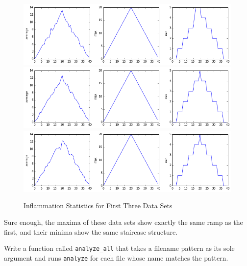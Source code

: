 \begin{figure}
\begin{center}
\includegraphics[scale=0.5]{novice/python/img/inflammation-loop-01.png}
\includegraphics[scale=0.5]{novice/python/img/inflammation-loop-02.png}
\includegraphics[scale=0.5]{novice/python/img/inflammation-loop-03.png}
\caption{Inflammation Statistics for First Three Data Sets}\label{f:inflammation-loop}
\end{center}
\end{figure}

Sure enough, the maxima of these data sets show exactly the same ramp as
the first, and their minima show the same staircase structure.

\begin{challenge}
  Write a function called \texttt{analyze\_all} that takes a filename
  pattern as its sole argument and runs \texttt{analyze} for each file
  whose name matches the pattern.
\end{challenge}


